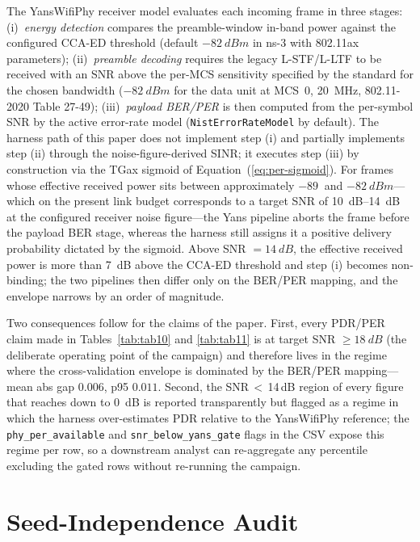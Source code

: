\documentclass[journal,onecolumn,11pt,a4paper]{IEEEtran}
\begin{document}
The YansWifiPhy receiver model evaluates each incoming frame in
three stages: (i)~\emph{energy detection} compares the
preamble-window in-band power against the configured CCA-ED
threshold (default $\SI{-82}{dBm}$ in ns-3 with 802.11ax
parameters); (ii)~\emph{preamble decoding} requires the legacy
L-STF/L-LTF to be received with an SNR above the per-MCS sensitivity
specified by the standard for the chosen bandwidth
($\SI{-82}{dBm}$ for the data unit at MCS~0, \SI{20}{MHz},
802.11-2020 Table 27-49); (iii)~\emph{payload BER/PER} is then
computed from the per-symbol SNR by the active error-rate model
(\texttt{NistErrorRateModel} by default). The harness path of this
paper does not implement step (i) and partially implements step (ii)
through the noise-figure-derived SINR; it executes step (iii) by
construction via the TGax sigmoid of Equation~(\ref{eq:per-sigmoid}).
For frames whose effective received power sits between approximately
$\SI{-89}{}$ and $\SI{-82}{dBm}$---which on the present link budget
corresponds to a target SNR of \SIrange{10}{14}{dB} at the configured
receiver noise figure---the Yans pipeline aborts the frame before
the payload BER stage, whereas the harness still assigns it a
positive delivery probability dictated by the sigmoid.
Above SNR $= \SI{14}{dB}$, the effective received power is more
than \SI{7}{dB} above the CCA-ED threshold and step (i) becomes
non-binding; the two pipelines then differ only on the BER/PER
mapping, and the envelope narrows by an order of magnitude.

Two consequences follow for the claims of the paper. First, every
PDR/PER claim made in Tables~\ref{tab:tab10} and \ref{tab:tab11}
is at target SNR $\geq \SI{18}{dB}$ (the deliberate operating
point of the campaign) and therefore lives in the regime where
the cross-validation envelope is dominated by the BER/PER
mapping---mean abs gap $0.006$, p95 $0.011$. Second, the
SNR\,$<$\,14\,dB region of every figure that reaches down to
\SI{0}{dB} is reported transparently but flagged as a regime in
which the harness over-estimates PDR relative to the
YansWifiPhy reference; the
\texttt{phy\_per\_available} and \texttt{snr\_below\_yans\_gate}
flags in the CSV expose this regime per row, so a downstream
analyst can re-aggregate any percentile excluding the gated rows
without re-running the campaign.

\section{Seed-Independence Audit}
\label{sec:seed-audit}
\end{document}
